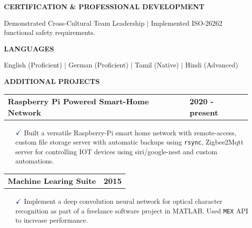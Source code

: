 \documentclass[a4paper,10pt]{article}
\begin{document}
\noindent{\rule{\linewidth}{1.4pt}}
\textbf{CERTIFICATION \& PROFESSIONAL DEVELOPMENT}

\vspace{-0.1cm}
\noindent{\rule{\linewidth}{0.01cm}}

\noindent Demonstrated Cross-Cultural Team Leadership $\vert$ Implemented ISO-26262 functional safety requirements.

\noindent{\rule{\linewidth}{1.4pt}}
\textbf{LANGUAGES}

\vspace{-0.1cm}
\noindent{\rule{\linewidth}{0.01cm}}

\noindent English (Proficient) {$\vert$} German (Proficient) $\vert$ Tamil (Native) $\vert$ Hindi (Advanced)

\noindent{\rule{\linewidth}{1.4pt}}
\textbf{ADDITIONAL PROJECTS}

\vspace{-0.1cm}
\noindent{\rule{\linewidth}{0.01cm}}

\vspace{0.3cm}
\noindent
\begin{tabular}{ @{\hskip 0pt}m{} >{\raggedleft\arraybackslash}p{} }
    \noindent\textbf{Raspberry Pi Powered Smart-Home Network} & \textbf{2020 - present}
\end{tabular}

{\small
\begin{itemize}
    \item[$\textcolor{highlightcolor}{\checkmark}$]  
            Built a versatile Raspberry-Pi smart home network with
            remote-access, custom file storage server with automatic backups
            using {\verb|rsync|}, Zigbee2Mqtt server for controlling IOT devices using
            siri/google-nest and custom automations.
\end{itemize}
}

\vspace{0.3cm}
\noindent
\begin{tabular}{ @{\hskip 0pt}m{} >{\raggedleft\arraybackslash}p{} }
    \noindent\textbf{Machine Learing Suite} & \textbf{2015}
\end{tabular}

{\small
\begin{itemize}
    \item[$\textcolor{highlightcolor}{\checkmark}$]  
        Implement a deep convolution neural network for optical character recognition as part of a freelance software project in MATLAB. Used {\verb|MEX|} API to increase performance. 
\end{itemize}
}
\end{document}

